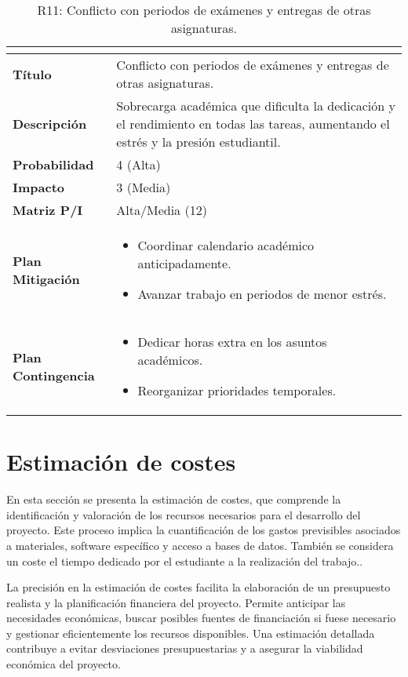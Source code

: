\begin{table}[H]
\centering
\begin{tabular}{|>{\bfseries}l|p{10cm}|}
\hline
\rowcolor{lightgray}
\multicolumn{2}{|c|}{\textbf{Riesgo R11}} \\ \hline
Título & Conflicto con periodos de exámenes y entregas de otras asignaturas.\\ \hline
Descripción & Sobrecarga académica que dificulta la dedicación y el rendimiento en todas las tareas, aumentando el estrés y la presión estudiantil. \\ \hline
Probabilidad & 4 (Alta) \\ \hline
Impacto & 3 (Media) \\ \hline
Matriz P/I & Alta/Media (12)\\ \hline
Plan Mitigación & 
\begin{itemize}
\item Coordinar calendario académico anticipadamente.
\item Avanzar trabajo en periodos de menor estrés.
\end{itemize} \\ \hline
Plan Contingencia & 
\begin{itemize}
\item Dedicar horas extra en los asuntos académicos.
\item Reorganizar prioridades temporales.
\end{itemize} \\ \hline
\end{tabular}
\caption{R11: Conflicto con periodos de exámenes y entregas de otras asignaturas.}
\label{tab:R11}
\end{table}

\section{Estimación de costes}
En esta sección se presenta la estimación de costes, que comprende la identificación y valoración de los recursos necesarios para el desarrollo del proyecto. Este proceso implica la cuantificación de los gastos previsibles asociados a materiales, software específico y acceso a bases de datos. También se considera un coste el tiempo dedicado por el estudiante a la realización del trabajo..

La precisión en la estimación de costes facilita la elaboración de un presupuesto realista y la planificación financiera del proyecto. Permite anticipar las necesidades económicas, buscar posibles fuentes de financiación si fuese necesario y gestionar eficientemente los recursos disponibles. Una estimación detallada contribuye a evitar desviaciones presupuestarias y a asegurar la viabilidad económica del proyecto.

